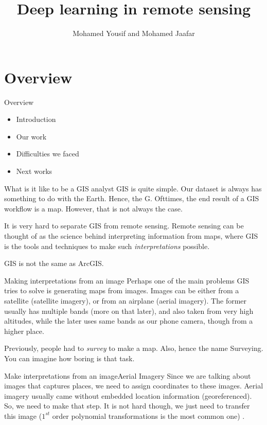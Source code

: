 \documentclass{beamer}
\author{Mohamed Yousif and Mohamed Jaafar}
\title{Deep learning in remote sensing}
\begin{document}
\maketitle
\section{Overview}
\begin{frame}{Overview}
  \begin{itemize}
  \item Introduction
  \item Our work
  \item Difficulties we faced
    \item Next works
  \end{itemize}
\end{frame}

\begin{frame}{What is it like to be a GIS analyst}
GIS is quite simple. Our dataset is always has something to do with the Earth.
Hence, the G. Ofttimes, the end result of a GIS workflow is a map. However, that
is not always the case.

It is very hard to separate GIS from remote sensing. Remote sensing can be
thought of as the science behind interpreting information from maps, where GIS
is the tools and techniques to make such \textit{interpretations} possible.

\alert{GIS is not the same as ArcGIS. }
\end{frame}

\begin{frame}{Making interpretations from an image}
  Perhaps one of the main problems GIS tries to solve is generating maps from
  images. Images can be either from a satellite (satellite imagery), or from an
  airplane (aerial imagery). The former usually has multiple bands (more on that
  later), and also taken from very high altitudes, while the later uses same
  bands as our phone camera, though from a higher place.

  Previously, people had to \textit{survey} to make a map. Also, hence the name
  Surveying. You can imagine how boring is that task.
\end{frame}

\begin{frame}{Make interpretations from an image}{Aerial Imagery}
Since we are talking about images that captures places, we need to assign
coordinates to these images. Aerial imagery usually came without embedded
location information (georeferenced). So, we need to make that step. It is not
hard though, we just need to transfer this image ($1^{st}$ order polynomial
transformations is the most common one) \cite{esri-transformations}.

\end{frame}
\end{document}
